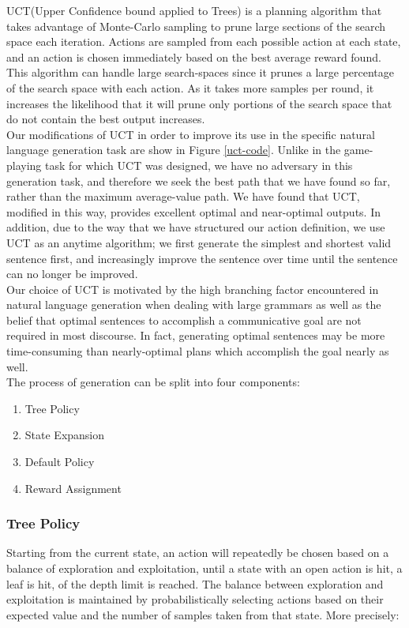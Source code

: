 UCT(Upper Confidence bound applied to Trees) \cite{kocsis_bandit_2006} is a planning algorithm that takes advantage of
Monte-Carlo sampling to prune large sections of the search space each iteration. Actions are sampled from each possible
action at each state, and an action is chosen immediately based on the best average reward found. This algorithm can
handle large search-spaces since it prunes a large percentage of the search space with each action. As it takes more
samples per round, it increases the likelihood that it will prune only portions of the search space that do not contain
the best output increases.\\

Our modifications of UCT in order to improve its use in the specific natural language generation task are show in Figure
\ref{uct-code}. Unlike in the game-playing task for which UCT was designed, we have no adversary in this generation
task, and therefore we seek the best path that we have found so far, rather than the maximum average-value path. We have
found that UCT, modified in this way, provides excellent optimal and near-optimal outputs. In addition, due to the way
that we have structured our action definition, we use UCT as an anytime algorithm; we first generate the simplest and
shortest valid sentence first, and increasingly improve the sentence over time until the sentence can no longer be
improved.\\

Our choice of UCT is motivated by the high branching factor encountered in natural language generation when dealing with
large grammars as well as the belief that optimal sentences to accomplish a communicative goal are not required in most
discourse. In fact, generating optimal sentences may be more time-consuming than nearly-optimal plans which accomplish
the goal nearly as well.\\

The process of generation can be split into four components:
\begin{enumerate}
\item Tree Policy
\item State Expansion
\item Default Policy
\item Reward Assignment
\end{enumerate}

\subsubsection{Tree Policy}
Starting from the current state, an action will repeatedly be chosen based on a balance of exploration and exploitation,
until a state with an open action is hit, a leaf is hit, of the depth limit is reached. The balance between exploration
and exploitation is maintained by probabilistically selecting actions based on their expected value and the number of
samples taken from that state. More precisely:

